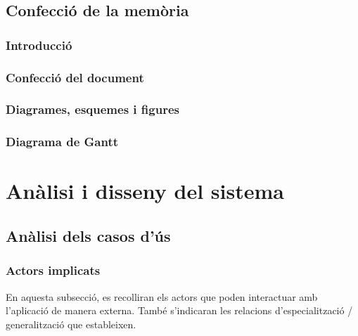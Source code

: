 \documentclass[a4paper,12pt]{ThesisStyle}
\begin{document}
\section{Confecció de la memòria}
\label{sec:decisions_memoria}

\subsection{Introducció}
\label{subsec:decisions_memoria_intro}



\subsection{Confecció del document}
\label{subsec:decisions_memoria_document}



\subsection{Diagrames, esquemes i figures}
\label{subsec:decisions_memoria_figures}



\subsection{Diagrama de Gantt}
\label{subsec:decisions_memoria_gantt}




\chapter{Anàlisi i disseny del sistema}
\label{cap:analisi}

\section{Anàlisi dels casos d'ús}
\label{sec:casos_us}

\subsection{Actors implicats}
\label{subsec:casos_us_actors}

En aquesta subsecció, es recolliran els actors que poden interactuar amb l'aplicació de manera externa. També s'indicaran les relacions d'especialització / generalització que estableixen.
\end{document}
